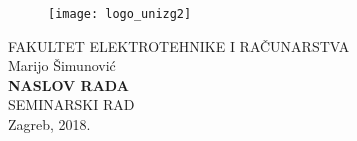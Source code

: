 \documentclass[12pt,oneside, a4paper]{article}
\begin{document}
\begin{titlepage}
  \fontsize{16pt}{20pt}\selectfont
  \selectfont
  \setlength{\intextsep}{0pt plus 0pt minus 0pt}

  \begin{center}
    \begin{figure}[ht!]
      \begin{center}
        \texttt{[image: logo\_unizg2]}
      \end{center}
    \end{figure}		
    \vspace{0cm}
    {FAKULTET ELEKTROTEHNIKE I RAČUNARSTVA} \\
    \vspace{3cm}
    Marijo Šimunović \\
    \vspace{2cm}
    {\fontsize{22pt}{22pt}\selectfont\textbf{NASLOV RADA}} \\
    \vspace{2cm}    
    SEMINARSKI RAD \\
    \vspace{5cm}    %
    \vfill{Zagreb, 2018.}
  \end{center}
  \restoregeometry
\end{titlepage}

\tableofcontents
\clearpage
\listoffigures
\clearpage
\listoftables
\clearpage


\clearpage


\clearpage


\clearpage


\clearpage


\clearpage


\clearpage

 




\end{document}
